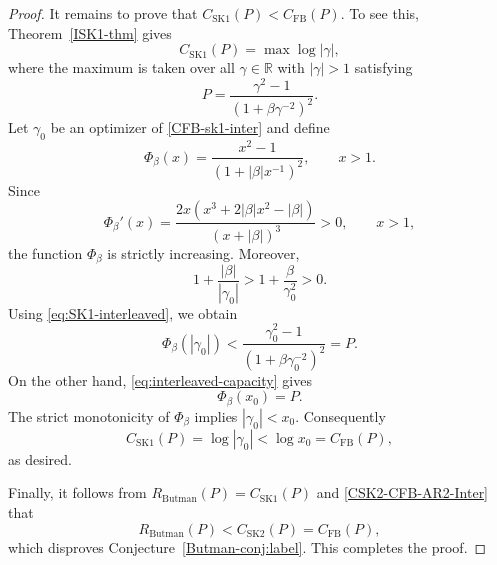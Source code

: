 \documentclass[10pt,a4paper]{amsart}
\begin{document}
\begin{proof}
It remains to prove that $C_{\mathrm{SK1}}(P)<C_{\mathrm{FB}}(P)$. To see this, Theorem~\ref{ISK1-thm} gives
\begin{equation}\label{CFB-sk1-inter}
C_\mathrm{SK1}(P)=\max\log |\gamma|,
\end{equation}
where the maximum is taken over all $\gamma\in\mathbb{R}$ with $|\gamma|>1$ satisfying 
\begin{equation}\label{eq:SK1-interleaved}
P= \frac{\gamma^2-1} {\left(1+\beta \gamma^{-2}\right)^2}.
\end{equation}
Let $\gamma_0$ be an optimizer of \eqref{CFB-sk1-inter} and define
$$
\Phi_\beta(x) = \frac{x^2-1}{\left(1+|\beta| x^{-1}\right)^2}, \qquad x>1.
$$
Since
$$
\Phi_\beta'(x) = \frac{2x\left(x^3+2|\beta| x^2-|\beta|\right)} {(x+|\beta|)^3} >0, \qquad x>1,
$$
the function $\Phi_\beta$ is strictly increasing. Moreover, 
$$
1+\frac{|\beta|}{|\gamma_0|} > 1+\frac{\beta}{\gamma_0^2} >0.
$$
Using \eqref{eq:SK1-interleaved}, we obtain
$$
\Phi_\beta(|\gamma_0|) < \frac{\gamma_0^2-1} {\left(1+\beta \gamma_0^{-2}\right)^2} = P.
$$
On the other hand, \eqref{eq:interleaved-capacity} gives
$$
\Phi_\beta(x_0)=P.
$$
The strict monotonicity of $\Phi_\beta$ implies $|\gamma_0|<x_0$. Consequently
$$
C_{\mathrm{SK1}}(P) = \log |\gamma_0| < \log x_0 = C_{\mathrm{FB}}(P),
$$
as desired.

Finally, it follows from $R_{\mathrm{Butman}}(P) = C_{\mathrm{SK1}}(P)$ and \eqref{CSK2-CFB-AR2-Inter} that 
$$
R_{\mathrm{Butman}}(P) < C_{\mathrm{SK2}}(P) = C_{\mathrm{FB}}(P),
$$
which disproves Conjecture~\ref{Butman-conj:label}. This completes the proof. 
\end{proof}
\end{document}
